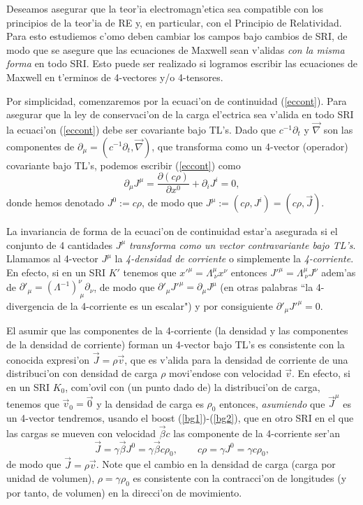 Deseamos asegurar que la teor'ia electromagn'etica sea compatible con los
principios de la teor'ia de RE y, en particular, con el Principio de Relatividad. Para esto estudiemos c'omo deben cambiar los campos bajo cambios de SRI, de modo que se asegure que las ecuaciones de Maxwell sean v'alidas \textit{con la misma forma} en todo SRI. Esto puede ser realizado si logramos escribir las ecuaciones de Maxwell en t'erminos de 4-vectores y/o 4-tensores.

Por simplicidad, comenzaremos por la ecuaci'on de continuidad (\ref{eccont}). Para asegurar que la ley de conservaci'on de la carga el'ectrica sea v'alida en todo SRI la
ecuaci'on (\ref{eccont}) debe ser covariante bajo TL's.  Dado que
$c^{-1}\partial_t$ y $\vec{\nabla}$ son las componentes de
$\partial_\mu=(c^{-1}\partial_t, \vec\nabla)$, que transforma
como un 4-vector (operador) covariante bajo TL's, podemos escribir
(\ref{eccont}) como
\begin{equation}
\partial_\mu J^\mu=\frac{\partial(c \rho)}{\partial x^0} + \partial_i J^i =0
,\label{dj0}
\end{equation}
donde hemos denotado $J^0:=c \rho $, 
de modo que $J^\mu :=(c \rho,J^i)=(c \rho,\vec{J})$.

La invariancia de forma de la ecuaci'on de continuidad estar'a asegurada si el conjunto de 4 cantidades $J^\mu$ \textit{transforma como un vector contravariante bajo TL's}. Llamamos al 4-vector $J^\mu$ la \textit{4-densidad de corriente} o simplemente la \textit{4-corriente}. En efecto, si en un SRI $K'$ tenemos que $x'^\mu=\Lambda^\mu_{\ \nu}x^\nu$ entonces $J'^\mu=\Lambda^\mu_{\ \nu}J^\nu$ adem'as de $\partial'_\mu=(\Lambda^{-1})^\nu_{\  \mu}\partial_\nu$, de modo que $\partial'_\mu J'^\mu=\partial_\mu J^\mu$ (en otras palabras ``la 4-divergencia de la 4-corriente es un escalar") y por consiguiente $\partial'_\mu J'^\mu=0$.

El asumir que las componentes de la 4-corriente (la densidad y las componentes de la densidad de corriente) forman un 4-vector bajo TL's es consistente con la conocida expresi'on $\vec{J}=\rho\vec{v}$, que es v'alida para la densidad de corriente de una
distribuci'on con densidad de carga $\rho$ movi'endose con velocidad $\vec{v}$.
En efecto, si en un SRI $K_0$, com'ovil con (un punto dado de) la distribuci'on de carga, tenemos que $\vec{v}_0=\vec{0}$ y la densidad de carga es $\rho_0$ entonces, \textit{asumiendo} que $\vec{J}^\mu$ es un 4-vector tendremos, usando el boost (\ref{bg1})-(\ref{bg2}), que en otro SRI en el que las cargas se mueven con velocidad $\vec\beta c$ las componente de la 4-corriente ser'an
\begin{equation}
\vec{J}=\gamma\vec\beta J^0=\gamma\vec\beta c \rho_0, \qquad  c\rho=\gamma J^0=\gamma c
\rho_0,
\end{equation}
de modo que $\vec{J}=\rho\vec{v}$. Note que el cambio en la densidad de
carga (carga por unidad de volumen), $\rho=\gamma\rho_0$ es consistente con la contracci'on de longitudes (y por tanto, de volumen) en la direcci'on de movimiento.

